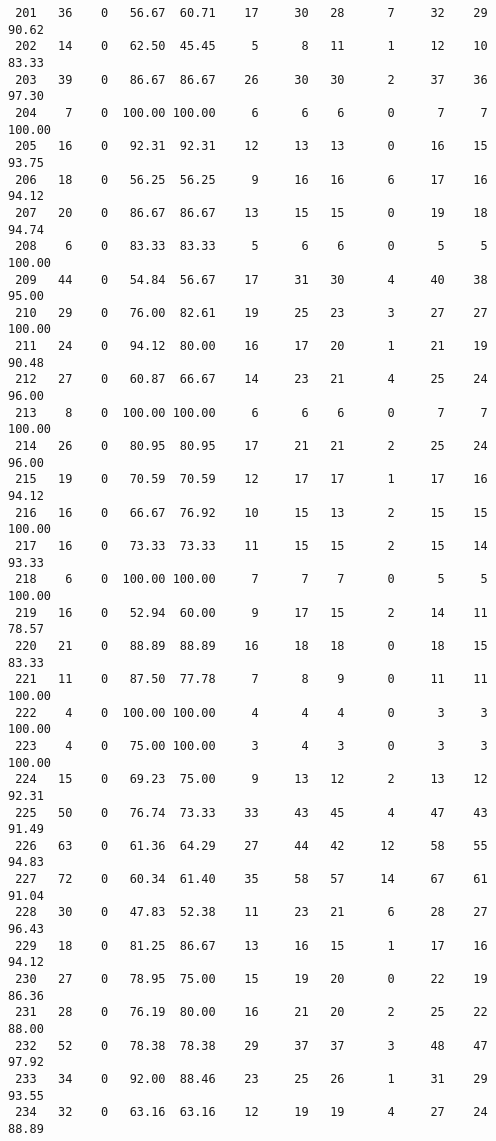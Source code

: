 \begin{verbatim}
 201   36    0   56.67  60.71    17     30   28      7     32    29    90.62
 202   14    0   62.50  45.45     5      8   11      1     12    10    83.33
 203   39    0   86.67  86.67    26     30   30      2     37    36    97.30
 204    7    0  100.00 100.00     6      6    6      0      7     7   100.00
 205   16    0   92.31  92.31    12     13   13      0     16    15    93.75
 206   18    0   56.25  56.25     9     16   16      6     17    16    94.12
 207   20    0   86.67  86.67    13     15   15      0     19    18    94.74
 208    6    0   83.33  83.33     5      6    6      0      5     5   100.00
 209   44    0   54.84  56.67    17     31   30      4     40    38    95.00
 210   29    0   76.00  82.61    19     25   23      3     27    27   100.00
 211   24    0   94.12  80.00    16     17   20      1     21    19    90.48
 212   27    0   60.87  66.67    14     23   21      4     25    24    96.00
 213    8    0  100.00 100.00     6      6    6      0      7     7   100.00
 214   26    0   80.95  80.95    17     21   21      2     25    24    96.00
 215   19    0   70.59  70.59    12     17   17      1     17    16    94.12
 216   16    0   66.67  76.92    10     15   13      2     15    15   100.00
 217   16    0   73.33  73.33    11     15   15      2     15    14    93.33
 218    6    0  100.00 100.00     7      7    7      0      5     5   100.00
 219   16    0   52.94  60.00     9     17   15      2     14    11    78.57
 220   21    0   88.89  88.89    16     18   18      0     18    15    83.33
 221   11    0   87.50  77.78     7      8    9      0     11    11   100.00
 222    4    0  100.00 100.00     4      4    4      0      3     3   100.00
 223    4    0   75.00 100.00     3      4    3      0      3     3   100.00
 224   15    0   69.23  75.00     9     13   12      2     13    12    92.31
 225   50    0   76.74  73.33    33     43   45      4     47    43    91.49
 226   63    0   61.36  64.29    27     44   42     12     58    55    94.83
 227   72    0   60.34  61.40    35     58   57     14     67    61    91.04
 228   30    0   47.83  52.38    11     23   21      6     28    27    96.43
 229   18    0   81.25  86.67    13     16   15      1     17    16    94.12
 230   27    0   78.95  75.00    15     19   20      0     22    19    86.36
 231   28    0   76.19  80.00    16     21   20      2     25    22    88.00
 232   52    0   78.38  78.38    29     37   37      3     48    47    97.92
 233   34    0   92.00  88.46    23     25   26      1     31    29    93.55
 234   32    0   63.16  63.16    12     19   19      4     27    24    88.89

\end{verbatim}
